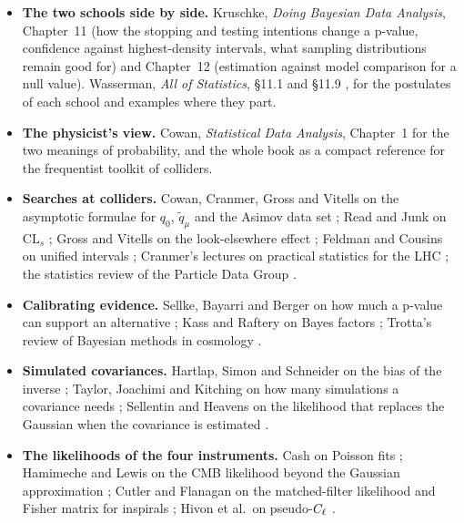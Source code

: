 \begin{itemize}[itemsep=2pt,leftmargin=1.2em]
  \item \textbf{The two schools side by side.} Kruschke, \emph{Doing Bayesian Data
        Analysis}, Chapter~11 (how the stopping and testing intentions change a
        p-value, confidence against highest-density intervals, what sampling
        distributions remain good for) and Chapter~12 (estimation against model
        comparison for a null value). Wasserman, \emph{All of Statistics}, \S11.1 and
        \S11.9 , for the postulates of each school and
        examples where they part.
  \item \textbf{The physicist's view.} Cowan, \emph{Statistical Data Analysis},
        Chapter~1 for the two meanings of probability, and the whole book as a compact
        reference for the frequentist toolkit of colliders.
  \item \textbf{Searches at colliders.} Cowan, Cranmer, Gross and Vitells on the
        asymptotic formulae for $q_0$, $\tilde q_\mu$ and the Asimov data set
        \cite{Cowan2011}; Read and Junk on $\mathrm{CL}_s$ \cite{Read2002,Junk1999};
        Gross and Vitells on the look-elsewhere effect \cite{GrossVitells2010};
        Feldman and Cousins on unified intervals \cite{FeldmanCousins1998}; Cranmer's
        lectures on practical statistics for the LHC \cite{Cranmer2015}; the
        statistics review of the Particle Data Group \cite{PDG2024}.
  \item \textbf{Calibrating evidence.} Sellke, Bayarri and Berger on how much a
        p-value can support an alternative \cite{Sellke2001}; Kass and Raftery on Bayes
        factors \cite{KassRaftery1995}; Trotta's review of Bayesian methods in
        cosmology \cite{Trotta2008}.
  \item \textbf{Simulated covariances.} Hartlap, Simon and Schneider on the bias of
        the inverse \cite{Hartlap2007}; Taylor, Joachimi and Kitching on how many
        simulations a covariance needs \cite{Taylor2013}; Sellentin and Heavens on the
        likelihood that replaces the Gaussian when the covariance is estimated
        \cite{SellentinHeavens2016}.
  \item \textbf{The likelihoods of the four instruments.} Cash on Poisson fits
        \cite{Cash1979}; Hamimeche and Lewis on the CMB likelihood beyond the Gaussian
        approximation \cite{HamimecheLewis2008}; Cutler and Flanagan on the
        matched-filter likelihood and Fisher matrix for inspirals
        \cite{CutlerFlanagan1994}; Hivon et al.\ on pseudo-$C_\ell$ \cite{Hivon2002}.
\end{itemize}

